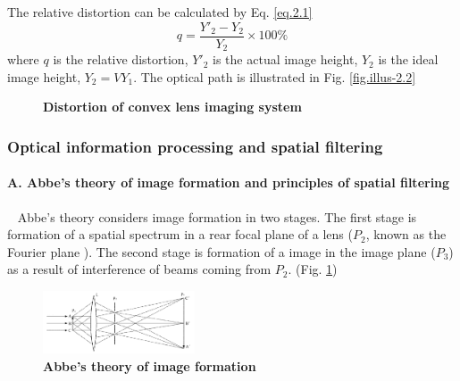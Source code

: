 \documentclass[10pt,a4paper,twocolumn,twoside,UTF8]{article}
\begin{document}
		The relative distortion can be calculated by Eq. \ref{eq.2.1}
		\begin{equation}
			q = \frac{Y'_2 - Y_2}{Y_2} \times 100\%
			\label{eq.2.1}
		\end{equation}
		where $q$ is the relative distortion, $Y'_2$ is the actual image height,  $Y_2$ is the ideal image height, $Y_2 = VY_1$.
		The optical path is illustrated in Fig. \ref{fig.illus-2.2}
		\begin{figure}[htbp]
			\centering		
			\caption{\textbf{Distortion of convex lens imaging system}}
		\end{figure}

		\subsubsection{Optical information processing and spatial filtering}
		\paragraph{A. Abbe's theory of image formation and principles of spatial filtering}~
		\newline 
		\indent
		Abbe's theory considers image formation in two stages. 
		The first stage is formation of a spatial spectrum in a rear focal plane of a lens ($P_2$, known as the Fourier plane ). 
		The second stage is formation of a image in the image plane ($P_3$) as a result of interference of beams coming from $P_2$. (Fig. \ref{fig.illus-3.1})
		\begin{figure}[htbp]
			\centering
			\includegraphics[width=0.4\textwidth]{attachments/fig.illus-3.1.png}
			\caption{\textbf{Abbe's theory of image formation}}
			\label{fig.illus-3.1}
		\end{figure}
\end{document}
